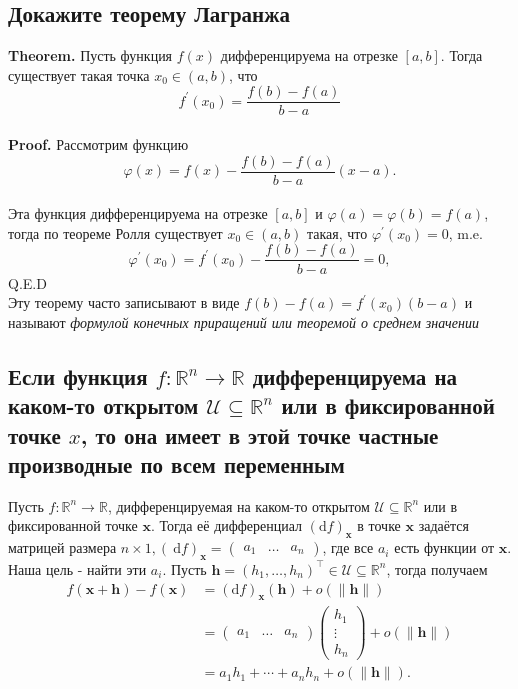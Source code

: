 \documentclass[a4paper]{article}
\begin{document}
\subsection{Докажите теорему Лагранжа}
\textbf{Theorem.} Пусть функция $f(x)$ дифференцируема на отрезке $[a, b]$. Тогда существует такая точка $x_0 \in(a, b)$, что
$$
f^{\prime}\left(x_0\right)=\frac{f(b)-f(a)}{b-a}
$$\\[2mm]
\textbf{Proof.} Рассмотрим функцию
$$
\varphi(x)=f(x)-\frac{f(b)-f(a)}{b-a}(x-a) .
$$\\[2mm]
Эта функция дифференцируема на отрезке $[a, b]$ и $\varphi(a)=\varphi(b)=f(a)$, тогда по теореме Ролля существует $x_0 \in(a, b)$ такая, что $\varphi^{\prime}\left(x_0\right)=0$, m.e.
$$
\varphi^{\prime}\left(x_0\right)=f^{\prime}\left(x_0\right)-\frac{f(b)-f(a)}{b-a}=0,
$$
Q.E.D\\[2mm]
Эту теорему часто записывают в виде $f(b)-f(a)=f^{\prime}\left(x_0\right)(b-a)$ и называют \textit{формулой конечных приращений или теоремой о среднем значении}


\subsection{Если функция $f: \mathbb{R}^n \rightarrow\mathbb{R}$ дифференцируема на каком-то открытом $\mathscr{U}\subseteq \mathbb{R}^n$ или в фиксированной точке $x$, то она имеет в этой точке частные производные по всем переменным}


Пусть $f: \mathbb{R}^n \rightarrow \mathbb{R}$, дифференцируемая на каком-то открытом $\mathscr{U} \subseteq \mathbb{R}^n$ или в фиксированной точке $\mathbf{x}$. Тогда её дифференциал $(\mathrm{d} f)_{\mathbf{x}}$ в точке $\mathbf{x}$ задаётся матрицей размера $n \times 1, (\mathrm{~d} f)_{\mathbf{x}}=\left(\begin{array}{lll}a_1 & \ldots & a_n\end{array}\right)$, где все $a_i$ есть функции от $\mathbf{x}$. Наша цель - найти эти $a_i$. Пусть $\mathbf{h}=\left(h_1, \ldots, h_n\right)^{\top} \in \mathscr{U} \subseteq \mathbb{R}^n$, тогда получаем
$$
\begin{aligned}
f(\mathbf{x}+\mathbf{h})-f(\mathbf{x}) & =(\mathrm{d} f)_{\mathbf{x}}(\mathbf{h})+o(\|\mathbf{h}\|) \\
& =\left(\begin{array}{lll}
a_1 & \ldots & a_n
\end{array}\right)\left(\begin{array}{c}
h_1 \\
\vdots \\
h_n
\end{array}\right)+o(\|\mathbf{h}\|) \\
& =a_1 h_1+\cdots+a_n h_n+o(\|\mathbf{h}\|) .
\end{aligned}
$$
\end{document}
